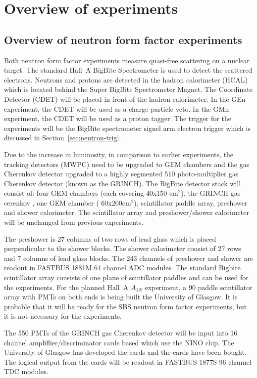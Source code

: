\documentclass[]{article}
\begin{document}
 \section{ Overview of experiments}
 \subsection{Overview of neutron form factor experiments}
 Both neutron form factor experiments measure quasi-free scattering on a nuclear target. The standard Hall~A
 BigBite Spectrometer is used to detect the scattered electrons.  
 Neutrons and protons are detected in
 the hadron calorimeter (HCAL) which is located behind the Super BigBite Spectrometer Magnet. 
 The Coordinate Detector (CDET) will be placed in front of the hadron calorimeter.
 In the GEn experiment, the CDET will be used as a charge particle veto. In the GMn experiment,
 the CDET will be used as a proton tagger. The trigger for the experiments will be the BigBite spectrometer 
 signel arm electron trigger which is discussed in Section~\ref{sec:neutron-trig}.
 
 
 Due to the increase in
 luminosity, in comparison to earlier experiments, the tracking detectors (MWPC) need to be upgraded to
 GEM chambers and the gas Cherenkov detector upgraded to a highly segmented 510 photo-multiplier gas
 Cherenkov detector (known as the GRINCH).   The BigBite detector stack will consist of:
 four GEM chambers (each covering 40x150 cm$^2$), the GRINCH gas cerenkov , one GEM chamber ( 60x200cm$^2$), 
 scintillator paddle array, preshower and shower calorimeter. The scintillator array and preshower/shower
 calorimeter will be unchanged from previous experiments. 
 
 The preshower is 27 columns of two rows of lead glass which is placed perpendicular to the shower blocks.
 The shower calorimeter consist of 27 rows and 7 columns of lead glass blocks. The 243 channels of
 preshower and shower are readout in FASTBUS 1881M 64 channel ADC modules. The standard Bigbite 
 scintillator array consists of one plane of scintillator paddles and can be used for the experiments. 
 For the planned Hall~A $A_{1N}$ experiment, a 90  paddle scintillator array with
 PMTs on both ends is being built the University of Glasgow. It is probable that it will
 be ready for the SBS neutron form factor experiments, but it is not necessary for the experiments.
 
 The 550 PMTs of the GRINCH gas Cherenkov detector will be input into 16 channel ampliflier/discriminator
 cards based which use the NINO chip. The University of Glasgow has developed the cards and the cards have 
 been bought. The logical output from the cards will be readout in FASTBUS 1877S 96 channel TDC modules.
 
\end{document}
